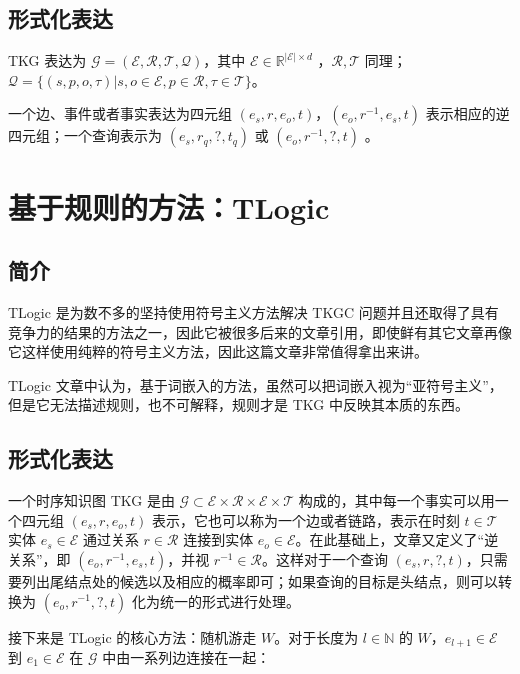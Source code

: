 \documentclass[a4paper, AutoFakeBold]{article}
\begin{document}
\subsection{形式化表达}

TKG 表达为 ${\mathcal G}=({\mathcal E},{\mathcal R},{\mathcal T},{\mathcal Q})$，其中 ${\mathcal E}\in{\mathbb R}^{|{\mathcal E}|\times d}$ ，${\mathcal R},{\mathcal T}$ 同理；${\mathcal Q}=\{(s,p,o,\tau)|s,o\in{\mathcal E},p\in{\mathcal R},\tau\in{\mathcal T}\}$。

一个边、事件或者事实表达为四元组 $(e_s,r,e_o,t)$，$(e_o,r^{-1},e_s,t)$ 表示相应的逆四元组；一个查询表示为 $(e_s,r_q,?,t_q)$ 或 $(e_o,r^{-1},?,t)$ 。


\section{基于规则的方法：TLogic}


\subsection{简介}

TLogic 是为数不多的坚持使用符号主义方法解决 TKGC 问题并且还取得了具有竞争力的结果的方法之一，因此它被很多后来的文章引用，即使鲜有其它文章再像它这样使用纯粹的符号主义方法，因此这篇文章非常值得拿出来讲。

TLogic 文章中认为，基于词嵌入的方法，虽然可以把词嵌入视为“亚符号主义”，但是它无法描述规则，也不可解释，规则才是 TKG 中反映其本质的东西。

\subsection{形式化表达}

一个时序知识图 TKG 是由 ${\mathcal G}\subset{\mathcal E}\times{\mathcal R}\times{\mathcal E}\times{\mathcal T}$ 构成的，其中每一个事实可以用一个四元组 $(e_s,r,e_o,t)$ 表示，它也可以称为一个边或者链路，表示在时刻 $t\in{\mathcal T}$ 实体 $e_s\in{\mathcal E}$ 通过关系 $r\in{\mathcal R}$ 连接到实体 $e_o\in{\mathcal E}$。在此基础上，文章又定义了“逆关系”，即 $(e_o,r^{-1},e_s,t)$，并视 $r^{-1}\in{\mathcal R}$。这样对于一个查询 $(e_s,r,?,t)$，只需要列出尾结点处的候选以及相应的概率即可；如果查询的目标是头结点，则可以转换为 $(e_o,r^{-1},?,t)$ 化为统一的形式进行处理。

接下来是 TLogic 的核心方法：随机游走 $W$。对于长度为 $l\in{\mathbb N}$ 的 $W$，$e_{l+1}\in{\mathcal E}$ 到 $e_1\in{\mathcal E}$ 在 ${\mathcal G}$ 中由一系列边连接在一起：
\end{document}
